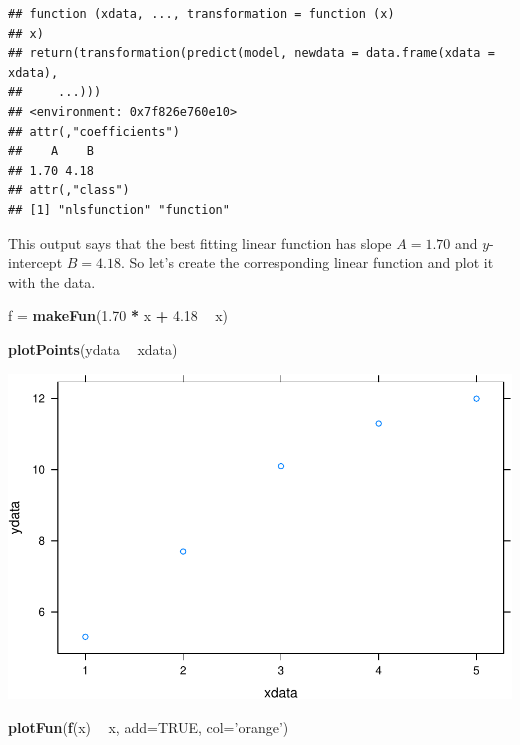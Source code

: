 \documentclass[
]{book}
\newenvironment{Shaded}{\begin{snugshade}}{\end{snugshade}}
\newcommand{\DataTypeTok}[1]{\textcolor[rgb]{0.13,0.29,0.53}{#1}}
\newcommand{\FloatTok}[1]{\textcolor[rgb]{0.00,0.00,0.81}{#1}}
\newcommand{\KeywordTok}[1]{\textcolor[rgb]{0.13,0.29,0.53}{\textbf{#1}}}
\newcommand{\NormalTok}[1]{#1}
\newcommand{\OperatorTok}[1]{\textcolor[rgb]{0.81,0.36,0.00}{\textbf{#1}}}
\newcommand{\OtherTok}[1]{\textcolor[rgb]{0.56,0.35,0.01}{#1}}
\newcommand{\StringTok}[1]{\textcolor[rgb]{0.31,0.60,0.02}{#1}}
\begin{document}
\begin{verbatim}
## function (xdata, ..., transformation = function (x) 
## x) 
## return(transformation(predict(model, newdata = data.frame(xdata = xdata), 
##     ...)))
## <environment: 0x7f826e760e10>
## attr(,"coefficients")
##    A    B 
## 1.70 4.18 
## attr(,"class")
## [1] "nlsfunction" "function"
\end{verbatim}

This output says that the best fitting linear function has slope \(A=1.70\) and \(y\)-intercept \(B=4.18\). So let's create the corresponding linear function and plot it with the data.

\begin{Shaded}
\begin{Highlighting}[]
\NormalTok{f =}\StringTok{ }\KeywordTok{makeFun}\NormalTok{(}\FloatTok{1.70} \OperatorTok{*}\StringTok{  }\NormalTok{x }\OperatorTok{+}\StringTok{ }\FloatTok{4.18} \OperatorTok{~}\StringTok{ }\NormalTok{x)}

\KeywordTok{plotPoints}\NormalTok{(ydata }\OperatorTok{~}\StringTok{ }\NormalTok{xdata)}
\end{Highlighting}
\end{Shaded}

\includegraphics{_bookdown_files/math135_handbook_files/figure-latex/unnamed-chunk-36-1.pdf}

\begin{Shaded}
\begin{Highlighting}[]
\KeywordTok{plotFun}\NormalTok{(}\KeywordTok{f}\NormalTok{(x) }\OperatorTok{~}\StringTok{ }\NormalTok{x,  }\DataTypeTok{add=}\OtherTok{TRUE}\NormalTok{, }\DataTypeTok{col=}\StringTok{'orange'}\NormalTok{)}
\end{Highlighting}
\end{Shaded}
\end{document}

